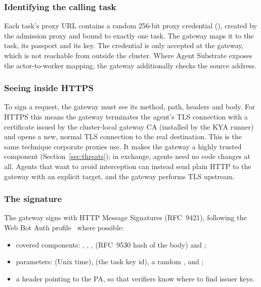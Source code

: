 \subsubsection{Identifying the calling task}

Each task's proxy URL contains a random 256-bit proxy credential (), created by the admission proxy and bound to exactly one task. The gateway maps it to the task, its passport and its key. The credential is only accepted at the gateway, which is not reachable from outside the cluster. Where Agent Substrate exposes the actor-to-worker mapping, the gateway additionally checks the source address.

\subsubsection{Seeing inside HTTPS}

To sign a request, the gateway must see its method, path, headers and body. For HTTPS this means the gateway terminates the agent's TLS connection with a certificate issued by the cluster-local gateway CA (installed by the KYA runner) and opens a new, normal TLS connection to the real destination. This is the same technique corporate proxies use. It makes the gateway a highly trusted component (Section~\ref{sec:threats}); in exchange, agents need no code changes at all. Agents that want to avoid interception can instead send plain HTTP to the gateway with an explicit target, and the gateway performs TLS upstream.

\subsubsection{The signature}

The gateway signs with HTTP Message Signatures (RFC~9421), following the Web Bot Auth profile~\cite{webbotauth} where possible:

\begin{itemize}
  \item covered components: , , ,  (RFC~9530 hash of the body) and ;
  \item parameters:  (Unix time),  (the task key id), a random , and ;
  \item a  header pointing to the PA, so that verifiers know where to find issuer keys.
\end{itemize}


